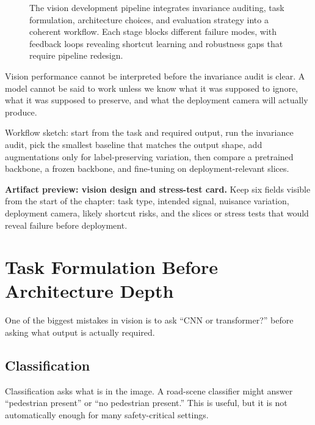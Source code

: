 \begin{figure}[t]
\centering
\resizebox{\linewidth}{!}{}
\caption{The vision development pipeline integrates invariance auditing, task formulation, architecture choices, and evaluation strategy into a coherent workflow. Each stage blocks different failure modes, with feedback loops revealing shortcut learning and robustness gaps that require pipeline redesign.}
\label{fig:vision-pipeline}
\end{figure}

\begin{decisionbox}
Vision performance cannot be interpreted before the invariance audit is clear. A model cannot be said to work unless we know what it was supposed to ignore, what it was supposed to preserve, and what the deployment camera will actually produce.
\end{decisionbox}

\begin{practicalnote}
Workflow sketch: start from the task and required output, run the invariance audit, pick the smallest baseline that matches the output shape, add augmentations only for label-preserving variation, then compare a pretrained backbone, a frozen backbone, and fine-tuning on deployment-relevant slices.
\end{practicalnote}

\begin{thinkingtool}
\textbf{Artifact preview: vision design and stress-test card.} Keep six fields visible from the start of the chapter: task type, intended signal, nuisance variation, deployment camera, likely shortcut risks, and the slices or stress tests that would reveal failure before deployment.
\end{thinkingtool}

\section{Task Formulation Before Architecture Depth}

One of the biggest mistakes in vision is to ask ``CNN or transformer?'' before asking what output is actually required.

\subsection{Classification}

Classification asks what is in the image. A road-scene classifier might answer ``pedestrian present'' or ``no pedestrian present.'' This is useful, but it is not automatically enough for many safety-critical settings.

